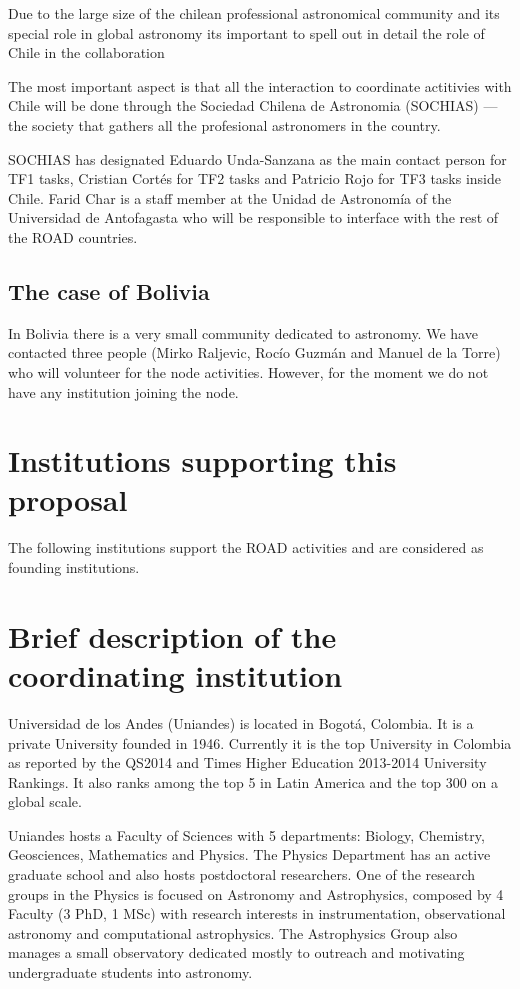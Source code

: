 \documentclass[12pt]{article}
\begin{document}
Due to the large size of the chilean professional astronomical
community and its special role in global astronomy its important to
spell out in detail the role of Chile in the collaboration

The most important aspect is that all the interaction to coordinate
actitivies with Chile will be done through the Sociedad Chilena de
Astronomia (SOCHIAS) --- the society that gathers all the profesional
astronomers in the country.

SOCHIAS has designated Eduardo Unda-Sanzana as the main contact
person for TF1 tasks, Cristian Cort\'es for TF2 tasks and Patricio
Rojo for TF3 tasks inside Chile. Farid Char is a staff member at the
Unidad de Astronomía of the Universidad de Antofagasta who will be
responsible to interface with the rest of the ROAD countries. 


\subsection*{The case of Bolivia}

In Bolivia there is a very small community dedicated to
astronomy. We have contacted three people (Mirko Raljevic, Roc\'io
Guzm\'an and Manuel de la Torre) who will volunteer for the node
activities. However, for the moment we do not have any institution
joining the node.

\appendixpage
\appendix
\section{Institutions supporting this proposal}

The following institutions support the ROAD activities and are
considered as founding institutions.

\section{Brief description of the coordinating institution}

Universidad de los Andes (Uniandes) is located in Bogotá, Colombia. It
is a private University founded in 1946. Currently it is the top
University in Colombia as reported by the QS2014 and Times
Higher Education 2013-2014 University Rankings. It also ranks among
the top 5 in Latin America and the top 300 on a global scale.    

Uniandes hosts a Faculty of Sciences with 5 departments: Biology,
Chemistry, Geosciences, Mathematics and Physics. The Physics
Department has an active graduate school and also hosts postdoctoral
researchers. One of the research groups in the Physics is focused on
Astronomy and Astrophysics, composed by 4 Faculty (3 PhD, 1 MSc) with
research interests in instrumentation, observational astronomy and
computational astrophysics. The Astrophysics Group also manages a
small observatory dedicated mostly to outreach and motivating
undergraduate students into astronomy. 
\end{document}
